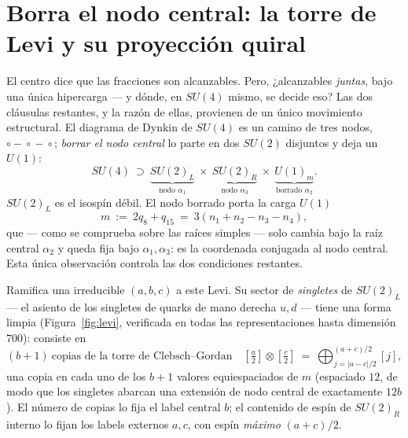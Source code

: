 \documentclass[11pt,a4paper]{article}
\begin{document}
\section{Borra el nodo central: la torre de Levi y su proyección quiral}\label{sec:levi}
El centro dice que las fracciones son alcanzables. Pero, ¿alcanzables \emph{juntas}, bajo una
única hipercarga --- y dónde, en $SU(4)$ mismo, se decide eso? Las dos cláusulas restantes, y
la razón de ellas, provienen de un único movimiento estructural. El diagrama de Dynkin de
$SU(4)$ es un camino de tres nodos, $\circ\!-\!\circ\!-\!\circ$; \emph{borrar el nodo central}
lo parte en dos $SU(2)$ disjuntos y deja un $U(1)$:
\begin{equation}
SU(4)\ \supset\ \underbrace{SU(2)_L}_{\text{nodo }\alpha_1}\ \times\
\underbrace{SU(2)_R}_{\text{nodo }\alpha_3}\ \times\ \underbrace{U(1)_m}_{\text{borrado }\alpha_2}.
\end{equation}
$SU(2)_L$ es el isospín débil. El nodo borrado porta la carga $U(1)$
\begin{equation}
m\ :=\ 2q_8+q_{15}\ =\ 3(n_1+n_2-n_3-n_4),
\end{equation}
que --- como se comprueba sobre las raíces simples --- solo cambia bajo la raíz central
$\alpha_2$ y queda fija bajo $\alpha_1,\alpha_3$: es la coordenada conjugada al nodo central.
Esta única observación controla las dos condiciones restantes.

Ramifica una irreducible $(a,b,c)$ a este Levi. Su sector de \emph{singletes} de $SU(2)_L$ ---
el asiento de los singletes de quarks de mano derecha $u,d$ --- tiene una forma limpia
(Figura~\ref{fig:levi}, verificada en todas las representaciones hasta dimensión $700$):
consiste en
\begin{equation}\label{eq:tower}
(b+1)\ \text{copias de la torre de Clebsch--Gordan}\quad
[\tfrac a2]\otimes[\tfrac c2]\ =\ \bigoplus_{j=|a-c|/2}^{(a+c)/2}[j],
\end{equation}
una copia en cada uno de los $b+1$ valores equiespaciados de $m$ (espaciado $12$, de modo que
los singletes abarcan una extensión de nodo central de exactamente $12b$). El número de copias
lo fija el label central $b$; el contenido de espín de $SU(2)_R$ interno lo fijan los labels
externos $a,c$, con espín \emph{máximo} $(a+c)/2$.
\end{document}
